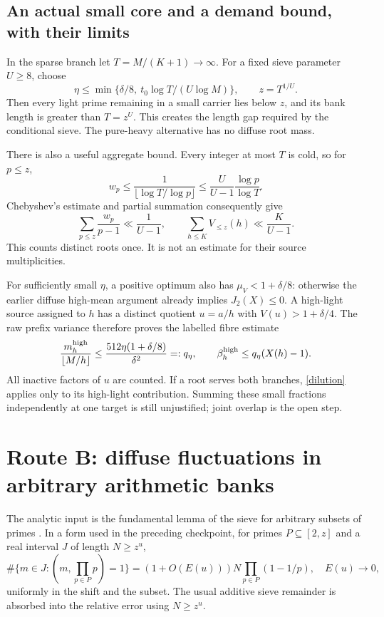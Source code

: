\documentclass[11pt,a4paper]{article}
\begin{document}
\subsection{An actual small core and a demand bound, with their limits}
In the sparse branch let $T=M/(K+1)\to\infty$. For a fixed sieve parameter
$U\ge8$, choose
\[
 \eta\le\min\{\delta/8,\ t_0\log T/(U\log M)\},\qquad z=T^{1/U}.
\]
Then every light prime remaining in a small carrier lies below $z$, and its
bank length is greater than $T=z^U$. This creates the length gap required by
the conditional sieve. The pure-heavy alternative has no diffuse root mass.

There is also a useful aggregate bound. Every integer at most $T$ is cold,
so for $p\le z$,
\[
 w_p\le\frac1{\lfloor\log T/\log p\rfloor}
 \le\frac U{U-1}\frac{\log p}{\log T}.
\]
Chebyshev's estimate and partial summation consequently give
\begin{equation}
 \sum_{p\le z}\frac{w_p}{p-1}\ll\frac1{U-1},\qquad
 \sum_{h\le K}V_{\le z}(h)\ll\frac K{U-1}.                \label{coremean}
\end{equation}
This counts distinct roots once. It is not an estimate for their source
multiplicities.

For sufficiently small $\eta$, a positive optimum also has
$\mu_V<1+\delta/8$: otherwise the earlier diffuse high-mean argument already
implies $J_2(X)\le0$. A high-light source assigned to $h$ has a distinct
quotient $u=a/h$ with $V(u)>1+\delta/4$. The raw prefix variance therefore
proves the labelled fibre estimate
\begin{equation}
 \frac{m_h^{\rm high}}{\lfloor M/h\rfloor}
 \le\frac{512\eta(1+\delta/8)}{\delta^2}=:q_\eta,
 \qquad \beta_h^{\rm high}\le q_\eta(X(h)-1).             \label{dilution}
\end{equation}
All inactive factors of $u$ are counted. If a root serves both branches,
\eqref{dilution} applies only to its high-light contribution. Summing these
small fractions independently at one target is still unjustified; joint
overlap is the open step.

\section{Route B: diffuse fluctuations in arbitrary arithmetic banks}

The analytic input is the fundamental lemma of the sieve for arbitrary
subsets of primes \cite{GS}. In a form used in the preceding checkpoint,
for primes $P\subseteq[2,z]$ and a real interval $J$ of length $N\ge z^u$,
\begin{equation}
 \#\{m\in J:(m,\prod_{p\in P}p)=1\}
 =(1+O(E(u)))N\prod_{p\in P}(1-1/p),\quad E(u)\to0,
 \label{sieve}
\end{equation}
uniformly in the shift and the subset. The usual additive sieve remainder
is absorbed into the relative error using $N\ge z^u$.
\end{document}
